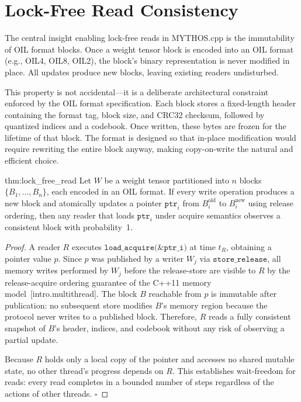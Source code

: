 \section{Lock-Free Read Consistency}
\label{sec:lock_free_read}

The central insight enabling lock-free reads in MYTHOS.cpp is the immutability of OIL format blocks. Once a weight tensor block is encoded into an OIL format (e.g., OIL4, OIL8, OIL2), the block's binary representation is never modified in place. All updates produce new blocks, leaving existing readers undisturbed.

This property is not accidental---it is a deliberate architectural constraint enforced by the OIL format specification. Each block stores a fixed-length header containing the format tag, block size, and CRC32 checksum, followed by quantized indices and a codebook. Once written, these bytes are frozen for the lifetime of that block. The format is designed so that in-place modification would require rewriting the entire block anyway, making copy-on-write the natural and efficient choice.

\begin{mythm}{thm:lock_free_read}
Let $W$ be a weight tensor partitioned into $n$ blocks $\{B_1, \ldots, B_n\}$, each encoded in an OIL format. If every write operation produces a new block and atomically updates a pointer $\texttt{ptr}_i$ from $B_i^{\text{old}}$ to $B_i^{\text{new}}$ using release ordering, then any reader that loads $\texttt{ptr}_i$ under acquire semantics observes a consistent block with probability~1.
\end{mythm}

\begin{proof}
A reader $R$ executes $\texttt{load\_acquire(\&ptr\_i)}$ at time $t_R$, obtaining a pointer value $p$. Since $p$ was published by a writer $W_j$ via $\texttt{store\_release}$, all memory writes performed by $W_j$ before the release-store are visible to $R$ by the release-acquire ordering guarantee of the C++11 memory model~[intro.multithread]. The block $B$ reachable from $p$ is immutable after publication: no subsequent store modifies $B$'s memory region because the protocol never writes to a published block. Therefore, $R$ reads a fully consistent snapshot of $B$'s header, indices, and codebook without any risk of observing a partial update.

Because $R$ holds only a local copy of the pointer and accesses no shared mutable state, no other thread's progress depends on $R$. This establishes wait-freedom for reads: every read completes in a bounded number of steps regardless of the actions of other threads. $\square$
\end{proof}

